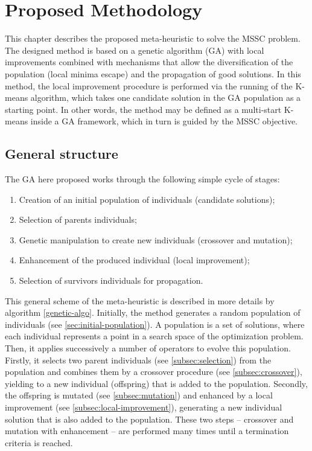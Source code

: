 \chapter{Proposed Methodology}
\label{chap:methodology}
This chapter describes the proposed meta-heuristic to solve the MSSC problem. The designed method is based on a genetic algorithm (GA) with local improvements combined with mechanisms that allow the diversification of the population (local minima escape) and the propagation of good solutions. In this method, the local improvement procedure is performed via the running of the K-means algorithm, which takes one candidate solution in the GA population as a starting point. In other words, the method may be defined as a multi-start K-means inside a GA framework, which in turn is guided by the MSSC objective. 

\section{General structure}
\label{sec:general-structure}
The GA here proposed works through the following simple cycle of stages:

\begin{enumerate}
	\item Creation of an initial population of individuals (candidate solutions);

	\item Selection of parents individuals;

	\item Genetic manipulation to create new individuals (crossover and mutation);
	
	\item Enhancement of the produced individual (local improvement);
	
	\item Selection of survivors individuals for propagation.
	
\end{enumerate}

This general scheme of the meta-heuristic is described in more details by algorithm \ref{genetic-algo}. Initially, the method generates a random population of individuals (see \ref{sec:initial-population}). A population is a set of solutions, where each individual represents a point in a search space of the optimization problem. Then, it applies successively a number of operators to evolve this population. Firstly, it selects two parent individuals (see \ref{subsec:selection}) from the population and combines them by a crossover procedure (see \ref{subsec:crossover}), yielding to a new individual (offspring) that is added to the population. Secondly, the offspring is mutated (see \ref{subsec:mutation}) and enhanced by a local improvement (see \ref{subsec:local-improvement}), generating a new individual solution that is also added to the population. These two steps -- crossover and mutation with enhancement -- are performed many times until a termination criteria is reached.

